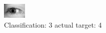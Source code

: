 \begin{figure}[h!]
\begin{center}
\includegraphics[width=0.60\columnwidth]{figures/ID3238_class_3_target_4.png}
\end{center}
\caption{ Classification: 3 actual target: 4}
\label{fig:ID3238_class_3_target_4}
\end{figure}
